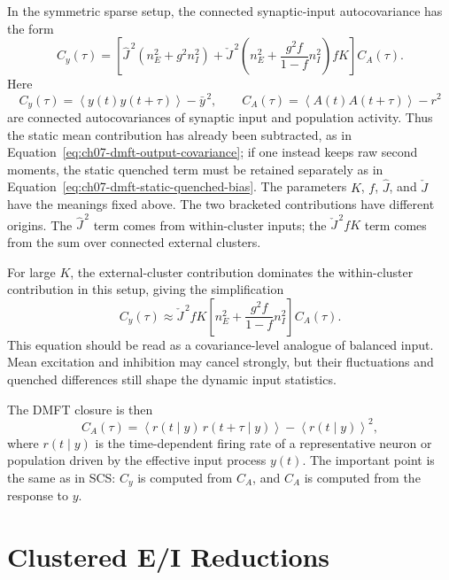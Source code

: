 In the symmetric sparse setup, the connected synaptic-input autocovariance has
the form
\[
        C_y(\tau)
        =
        \left[
        \widehat J^{\,2}\left(n_E^2+g^2n_I^2\right)
        +
        \check J^{\,2}
        \left(n_E^2+\frac{g^2 f}{1-f}n_I^2\right)fK
        \right]
        C_A(\tau).
        \label{eq:ch07-roadmap-input-autocovariance}
\]
Here
\[
        C_y(\tau)
        =
        \left\langle y(t)y(t+\tau)\right\rangle-\bar{y}^{\,2},
        \qquad
        C_A(\tau)
        =
        \left\langle A(t)A(t+\tau)\right\rangle-r^2
\]
are connected autocovariances of synaptic input and population activity. Thus
the static mean contribution has already been subtracted, as in
Equation~\eqref{eq:ch07-dmft-output-covariance}; if one instead keeps raw
second moments, the static quenched term must be retained separately as in
Equation~\eqref{eq:ch07-dmft-static-quenched-bias}. The parameters \(K\),
\(f\), \(\widehat J\), and \(\check J\) have the meanings fixed above. The two
bracketed contributions have different origins. The \(\widehat J^{\,2}\) term
comes from within-cluster inputs; the \(\check J^{\,2}fK\) term comes from the
sum over connected external clusters.

For large \(K\), the external-cluster contribution dominates the
within-cluster contribution in this setup, giving the simplification
\[
        C_y(\tau)
        \approx
        \check J^{\,2}fK
        \left[
        n_E^2+\frac{g^2 f}{1-f}n_I^2
        \right]
        C_A(\tau).
        \label{eq:ch07-large-k-covariance}
\]
This equation should be read as a covariance-level analogue of balanced input.
Mean excitation and inhibition may cancel strongly, but their fluctuations and
quenched differences still shape the dynamic input statistics.

The DMFT closure is then
\[
        C_A(\tau)
        =
        \left\langle
        r(t\mid y)\,r(t+\tau\mid y)
        \right\rangle
        -
        \left\langle r(t\mid y)\right\rangle^2,
        \label{eq:ch07-spiking-dmft-closure}
\]
where \(r(t\mid y)\) is the time-dependent firing rate of a representative
neuron or population driven by the effective input process \(y(t)\). The
important point is the same as in SCS: \(C_y\) is computed from \(C_A\), and
\(C_A\) is computed from the response to \(y\).

\section{Clustered E/I Reductions}
\label{sec:ch07-ei-clustered-dmft}

